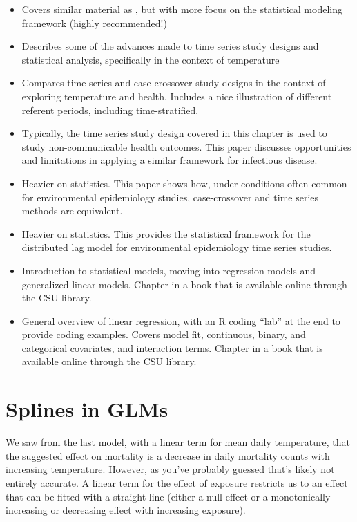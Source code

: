 \documentclass[
]{book}
\providecommand{\tightlist}{%
  \setlength{\itemsep}{0pt}\setlength{\parskip}{0pt}}
\begin{document}
\begin{itemize}
\tightlist
\item
  \citet{armstrong2006models} Covers similar material as \citet{bhaskaran2013time}, but with
  more focus on the statistical modeling framework (highly recommended!)
\item
  \citet{gasparrini2010time} Describes some of the advances made to time series study
  designs and statistical analysis, specifically in the context of temperature
\item
  \citet{basu2005temperature} Compares time series and case-crossover study designs in
  the context of exploring temperature and health. Includes a nice illustration
  of different referent periods, including time-stratified.
\item
  \citet{imai2015time} Typically, the time series study design covered in this
  chapter is used to study non-communicable health outcomes. This paper discusses
  opportunities and limitations in applying a similar framework for infectious
  disease.
\item
  \citet{lu2007equivalence} Heavier on statistics. This paper shows how, under
  conditions often common for environmental epidemiology studies, case-crossover
  and time series methods are equivalent.
\item
  \citet{gasparrini2014modeling} Heavier on statistics. This provides the statistical
  framework for the distributed lag model for environmental epidemiology time
  series studies.
\item
  \citet{dunn2018generalized1} Introduction to statistical models, moving into regression models and
  generalized linear models. Chapter in a book that is available online through the CSU library.
\item
  \citet{james2013introduction3} General overview of linear regression, with an R coding
  ``lab'' at the end to provide coding examples. Covers model fit, continuous, binary,
  and categorical covariates, and interaction terms. Chapter in a book that is
  available online through the CSU library.
\end{itemize}

\section{Splines in GLMs}\label{splines-in-glms}

We saw from the last model, with a linear term for mean daily temperature, that the
suggested effect on mortality is a decrease in daily mortality counts with
increasing temperature. However, as you've probably guessed that's likely not
entirely accurate. A linear term for the effect of exposure restricts us to an
effect that can be fitted with a straight line (either a null effect or a
monotonically increasing or decreasing effect with increasing exposure).
\end{document}
